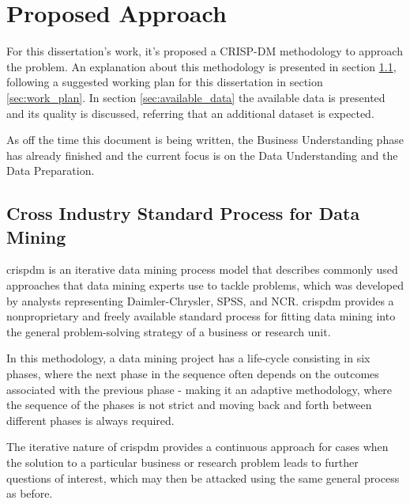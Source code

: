 \chapter{Proposed Approach}
\label{cha:available_data}

For this dissertation's work, it's proposed a CRISP-DM methodology to approach the problem. An explanation about this methodology is presented in section \ref{sec:crispdm}, following a suggested working plan for this dissertation in section \ref{sec:work_plan}. In section \ref{sec:available_data} the available data is presented and its quality is discussed, referring that an additional dataset is expected.

As off the time this document is being written, the Business Understanding phase has already finished and the current focus is on the Data Understanding and the Data Preparation.


\section{Cross Industry Standard Process for Data Mining} %
\label{sec:crispdm}

\Acrfull{crispdm} is an iterative data mining process model that describes commonly used approaches that data mining experts use to tackle problems, which was developed by analysts representing Daimler-Chrysler, SPSS, and NCR. \Acrshort{crispdm} provides a nonproprietary and freely available standard process for fitting data mining into the general problem-solving strategy of a business or research unit.

In this methodology, a data mining project has a life-cycle consisting in six phases, where the next phase in the sequence often depends on the outcomes associated with the previous phase - making it an adaptive methodology, where the sequence of the phases is not strict and moving back and forth between different phases is always required.

The iterative nature of \Acrshort{crispdm} provides a continuous approach for cases when the solution to a particular business or research problem leads to further questions of interest, which may then be attacked using the same general process as before.


